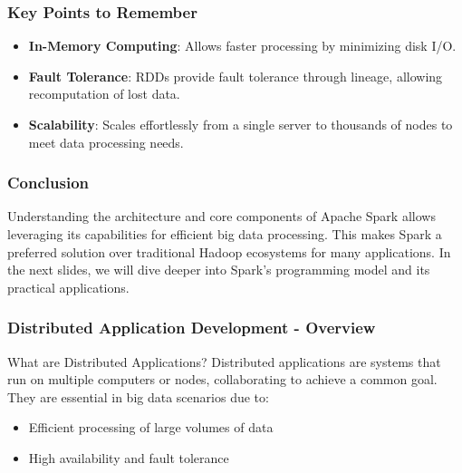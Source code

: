 \documentclass[aspectratio=169]{beamer}
\begin{document}
\begin{frame}[fragile]
    \frametitle{Key Points to Remember}
    \begin{itemize}
        \item \textbf{In-Memory Computing}: Allows faster processing by minimizing disk I/O.
        \item \textbf{Fault Tolerance}: RDDs provide fault tolerance through lineage, allowing recomputation of lost data.
        \item \textbf{Scalability}: Scales effortlessly from a single server to thousands of nodes to meet data processing needs.
    \end{itemize}
\end{frame}

\begin{frame}[fragile]
    \frametitle{Conclusion}
    Understanding the architecture and core components of Apache Spark allows leveraging its capabilities for efficient big data processing. This makes Spark a preferred solution over traditional Hadoop ecosystems for many applications. 
    In the next slides, we will dive deeper into Spark's programming model and its practical applications.
\end{frame}

\begin{frame}[fragile]
    \frametitle{Distributed Application Development - Overview}
    \begin{block}{What are Distributed Applications?}
        Distributed applications are systems that run on multiple computers or nodes, collaborating to achieve a common goal. 
        They are essential in big data scenarios due to:
        \begin{itemize}
            \item Efficient processing of large volumes of data
            \item High availability and fault tolerance
        \end{itemize}
    \end{block}
\end{frame}
\end{document}

